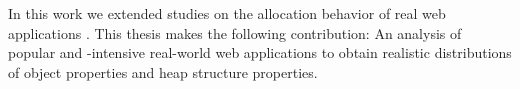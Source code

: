 In this work we extended studies on the allocation behavior of real \JS web
applications \cite{JSMeter2009}. This thesis makes the following contribution:
An analysis of popular and \JS-intensive real-world web applications to obtain
realistic distributions of object properties and heap structure properties.


% 
% 
% 

% 
